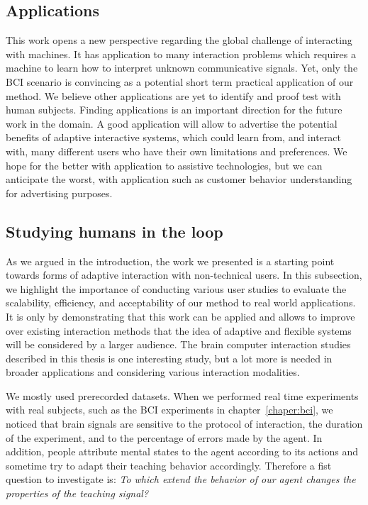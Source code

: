 \subsection{Applications}

This work opens a new perspective regarding the global challenge of interacting with machines. It has application to many interaction problems which requires a machine to learn how to interpret unknown communicative signals. Yet, only the BCI scenario is convincing as a potential short term practical application of our method. We believe other applications are yet to identify and proof test with human subjects. Finding applications is an important direction for the future work in the domain. A good application will allow to advertise the potential benefits of adaptive interactive systems, which could learn from, and interact with, many different users who have their own limitations and preferences. We hope for the better with application to assistive technologies, but we can anticipate the worst, with application such as customer behavior understanding for advertising purposes.

\subsection{Studying humans in the loop}
\label{chapter:limitations:userstudies}


As we argued in the introduction, the work we presented is a starting point towards forms of adaptive interaction with non-technical users. In this subsection, we highlight the importance of conducting various user studies to evaluate the scalability, efficiency, and acceptability of our method to real world applications. It is only by demonstrating that this work can be applied and allows to improve over existing interaction methods that the idea of adaptive and flexible systems will be considered by a larger audience. The brain computer interaction studies described in this thesis is one interesting study, but a lot more is needed in broader applications and considering various interaction modalities.

We mostly used prerecorded datasets. When we performed real time experiments with real subjects, such as the BCI experiments in chapter~\ref{chaper:bci}, we noticed that brain signals are sensitive to the protocol of interaction, the duration of the experiment, and to the percentage of errors made by the agent. In addition, people attribute mental states to the agent according to its actions and sometime try to adapt their teaching behavior accordingly. Therefore a fist question to investigate is: \emph{To which extend the behavior of our agent changes the properties of the teaching signal?}

